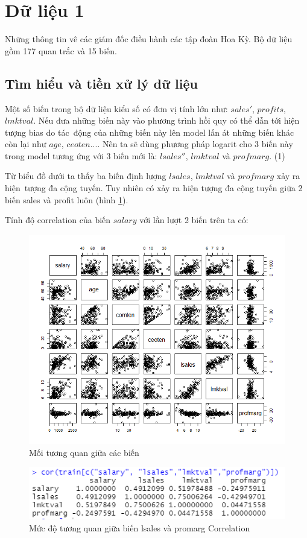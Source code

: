 \section{Dữ liệu 1}
Những thông tin vê các giám đốc điều hành các tập đoàn Hoa Kỳ. Bộ dữ liệu gồm 177 quan trắc và 15 biến.

\subsection*{Tìm hiểu và tiền xử lý dữ liệu}

Một số biến trong bộ dữ liệu kiểu số có đơn vị tính lớn như: $sales'$, $profits$, $lmktval$. Nếu đưa những biến này vào phương trình hồi quy có thể dẫn tới hiện tượng bias do tác~động của những biến này lên model lấn át những biến khác còn lại như $age$, $ceoten$.... Nên ta sẽ dùng phương pháp logarit cho 3 biến này trong model tương ứng với 3 biến mới là:  $lsales''$, $lmktval$   và $profmarg$. (1)


Từ biểu đồ dưới ta thấy ba biến định lượng $\textit{lsales}$, $\textit{lmktval}$ và $\textit{profmarg}$ xảy ra hiện~tượng đa cộng tuyến.
Tuy nhiên có xảy ra hiện tượng đa cộng tuyến giữa 2 biến sales và profit luôn (hình \ref{fig-b1:plot-vars}).

Tính độ correlation của biến $salary$ với lần lượt 2 biến trên ta có:

\begin{figure}[!h]
	\centering
	\includegraphics[width=.7\linewidth]{../Photo Of Result/B1_plotVriables.png}  
	\caption{Mối tương quan giữa các biến}
	\label{fig-b1:plot-vars}
\end{figure}

\begin{figure}[!h]
	\centering
	\includegraphics[scale = 0.6]{../Photo Of Result/B1_CorTable.PNG}  
	\caption{Mức độ tương quan giữa biến lsales và promarg Correlation}
	\label{fig-b1:corr-table}
\end{figure}

